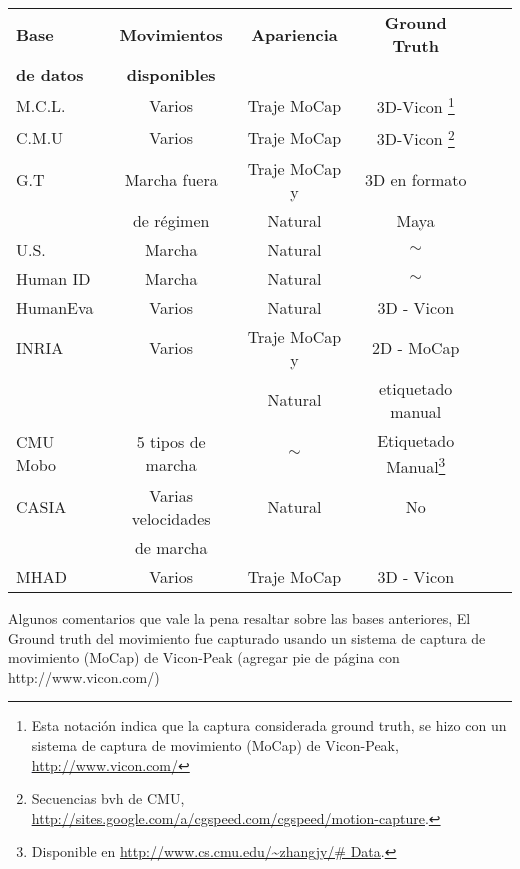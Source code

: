 \begin{table}[h!]
\begin{minipage}{\textwidth}
\begin{tabular}{||l|ccccc||}
\rowcolor[HTML]{CBCEFB}
\textbf{Base}     & \textbf{Movimientos}  & \textbf{Apariencia}    & \textbf{Ground Truth} & & \\
\rowcolor[HTML]{CBCEFB}
\textbf{de datos} & \textbf{disponibles} &               &           & & \\
\hline \hline

{M.C.L. }   & Varios    &  Traje MoCap & 3D-Vicon \footnote{ Esta notación indica que la captura considerada ground truth, se hizo con un sistema  de captura de movimiento (MoCap) de Vicon-Peak, \textcolor{blue}{\underline{\url{http://www.vicon.com/}}} } & & \\ \hline
{C.M.U }    & Varios    &  Traje MoCap & 3D-Vicon \footnote{Secuencias bvh de CMU, \textcolor{blue}{\underline{\url{http://sites.google.com/a/cgspeed.com/cgspeed/motion-capture}}}.} & & \\ \hline
{G.T} &     Marcha fuera&     Traje MoCap y       & 3D  en formato & & \\ 
	 &	   de régimen  &  Natural   &   Maya & & \\ \hline
U.S. &       Marcha    &  Natural    &  $\sim$ & &       \\	\hline
Human ID &     Marcha    & Natural  & $\sim$ &  &       \\ \hline
HumanEva &     Varios    & Natural  & 3D - Vicon & &   \\ \hline
INRIA &       Varios    & Traje MoCap y            & 2D - MoCap &   &       \\
  &           & Natural            &   etiquetado manual  & &         \\ \hline
  CMU Mobo &     5 tipos de marcha    & $\sim$           & Etiquetado Manual\footnote{Disponible en  \textcolor{blue}{\underline{\url{http://www.cs.cmu.edu/~zhangjy/\# Data}}}.} &         &        \\ \hline
CASIA &  Varias velocidades       &   Natural         & No  &         &      \\ 
 & de marcha        &            &   &         &      \\ \hline
MHAD & Varios        & Traje MoCap            & 3D - Vicon    &   &       \\
\hline\hline	 

	\end{tabular}
	\end{minipage}
	
\end{table}

Algunos comentarios que vale la pena resaltar sobre las bases anteriores, 
El Ground truth del movimiento fue capturado usando un sistema de captura de movimiento (MoCap) de Vicon-Peak (agregar pie de página con http://www.vicon.com/)




